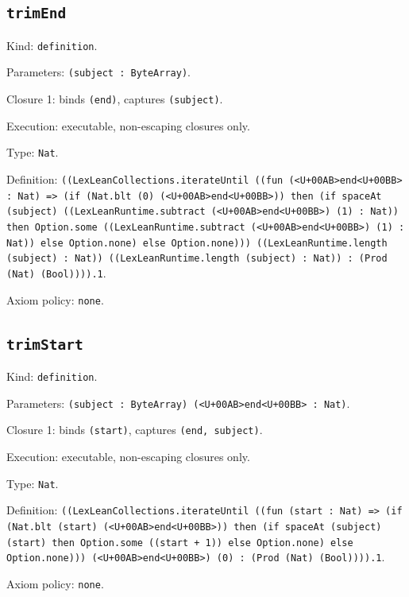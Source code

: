 \documentclass[11pt]{article}
\begin{document}
\subsection*{\texttt{trimEnd}}
\noindent Kind: \texttt{definition}.\par
\noindent Parameters: \texttt{(subject : ByteArray)}.\par
\noindent Closure 1: binds \texttt{(end)}, captures \texttt{(subject)}.\par
\noindent Execution: executable, non-escaping closures only.\par
\noindent Type: \texttt{Nat}.\par
\noindent Definition: \texttt{((LexLeanCollections.iterateUntil ((fun (<U+00AB>end<U+00BB> : Nat) => (if (Nat.blt (0) (<U+00AB>end<U+00BB>)) then (if spaceAt (subject) ((LexLeanRuntime.subtract (<U+00AB>end<U+00BB>) (1) : Nat)) then Option.some ((LexLeanRuntime.subtract (<U+00AB>end<U+00BB>) (1) : Nat)) else Option.none) else Option.none))) ((LexLeanRuntime.length (subject) : Nat)) ((LexLeanRuntime.length (subject) : Nat)) : (Prod (Nat) (Bool)))).1}.\par
\noindent Axiom policy: \texttt{none}.\par
\subsection*{\texttt{trimStart}}
\noindent Kind: \texttt{definition}.\par
\noindent Parameters: \texttt{(subject : ByteArray) (<U+00AB>end<U+00BB> : Nat)}.\par
\noindent Closure 1: binds \texttt{(start)}, captures \texttt{(end, subject)}.\par
\noindent Execution: executable, non-escaping closures only.\par
\noindent Type: \texttt{Nat}.\par
\noindent Definition: \texttt{((LexLeanCollections.iterateUntil ((fun (start : Nat) => (if (Nat.blt (start) (<U+00AB>end<U+00BB>)) then (if spaceAt (subject) (start) then Option.some ((start + 1)) else Option.none) else Option.none))) (<U+00AB>end<U+00BB>) (0) : (Prod (Nat) (Bool)))).1}.\par
\noindent Axiom policy: \texttt{none}.\par
\end{document}
